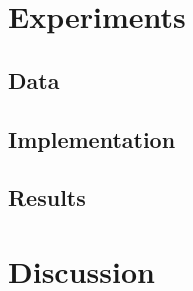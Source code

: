 \documentclass{article}
\begin{document}
\section{Experiments}

\subsection{Data}

\subsection{Implementation}

\subsection{Results}

\section{Discussion}


\end{document}
